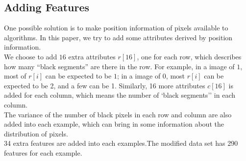 \documentclass[a4paper,11pt]{article}
\begin{document}
\subsection{Adding Features}
One possible solution is to make position information of pixels available to algorithms. In this paper, we try to add some attributes derived by position information.\\
We choose to add $16$ extra attributes $r[16]$, one for each row, which describes how many ``black segments'' are there in the row. For example, in a image of $1$, most of $r[i]$ can be expected to be $1$; in a image of 0, most $r[i]$ can be expected to be 2, and a few can be 1. Similarly, 16 more attributes $c[16]$ is added for each column, which means the number of `black segments'' in each column.\\
The variance of the number of black pixels in each row and column are also added into each example, which can bring in some information about the distribution of pixels.\\
34 extra features are added into each examples.The modified data set has 290 features for each example.
\end{document}
